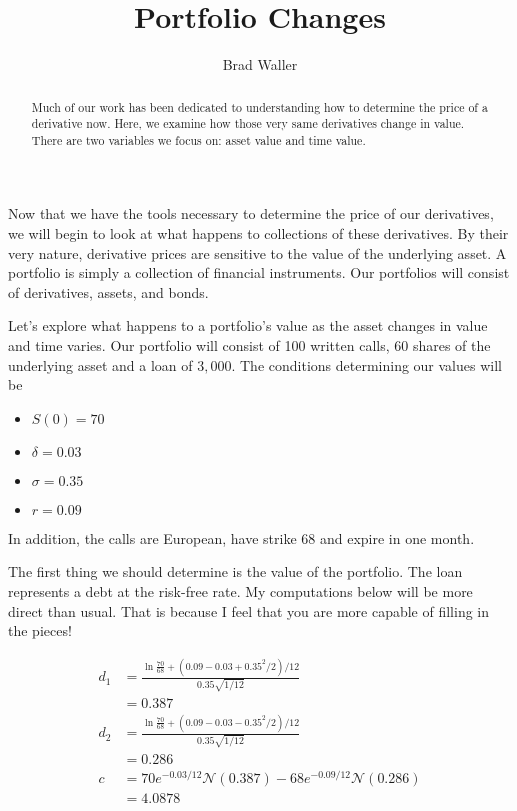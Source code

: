 \documentclass{ximera}
\author{Brad Waller}
\title{Portfolio Changes}
\begin{document}
\begin{abstract}
Much of our work has been dedicated to understanding how to determine the price of a derivative now. Here, we examine how those very same derivatives change in value. There are two variables we focus on: asset value and time value.
\end{abstract}

\maketitle

Now that we have the tools necessary to determine the price of our derivatives, we will begin to look at what happens to collections of these derivatives. By their very nature, derivative prices are sensitive to the value of the underlying asset. A portfolio is simply a collection of financial instruments. Our portfolios will consist of derivatives, assets, and bonds. 

Let's explore what happens to a portfolio's value as the asset changes in value and time varies. Our portfolio will consist of 100 written calls, 60 shares of the underlying asset and a loan of $3,000$. The conditions determining our values will be

\begin{itemize}
\item $S(0)=70$
\item $\delta=0.03$
\item $\sigma=0.35$
\item $r=0.09$
\end{itemize} 

In addition, the calls are European, have strike $68$ and expire in one month. 

The first thing we should determine is the value of the portfolio. The loan represents a debt at the risk-free rate. My computations below will be more direct than usual. That is because I feel that you are more capable of filling in the pieces!

\begin{align*}
d_1 		&=\frac{\ln\frac{70}{68}+(0.09-0.03+0.35^2/2)/12}{0.35\sqrt{1/12}}\\
		&=0.387\\
d_2 		&=\frac{\ln\frac{70}{68}+(0.09-0.03-0.35^2/2)/12}{0.35\sqrt{1/12}}\\
		&=0.286\\
c 		&=70e^{-0.03/12}\mathcal{N}(0.387)-68e^{-0.09/12}\mathcal{N}(0.286)\\
		&=4.0878
\end{align*}
\end{document}
